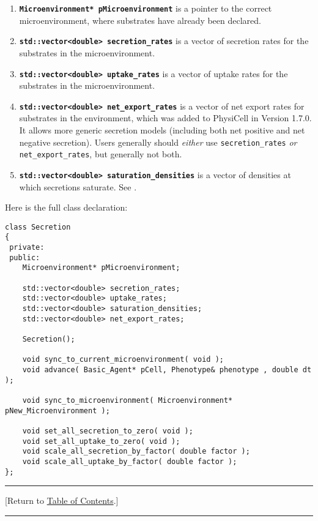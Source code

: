 \documentclass[12pt]{article}
\newcommand{\smallcode}[1]{\textbf{\texttt{#1}}}
\newcommand{\TOClink}{\begin{center}\hrule\vskip-5pt\phantom{.}\hfill[Return to \hyperlink{TOC}{Table of Contents}.]\hfill\phantom{.}\vskip3pt\hrule\end{center}}
\begin{document}
\begin{enumerate}
\item 
\smallcode{Microenvironment* pMicroenvironment} is a pointer to the correct microenvironment, where substrates have already been declared. 

\item 
\smallcode{std::vector<double> secretion\_rates} is a vector of secretion rates for the substrates in the microenvironment. 

\item 
\smallcode{std::vector<double> uptake\_rates} is a vector of uptake rates for the substrates in the microenvironment. 

\item 
\smallcode{std::vector<double> net\_export\_rates} is a vector of net export rates for substrates in the environment, which was 
added to PhysiCell in Version 1.7.0. It allows more generic secretion models (including both net positive and net negative secretion). 
Users generally should \emph{either} use \verb|secretion_rates| \emph{or} \verb|net_export_rates|, but generally not both. 

\item 
\smallcode{std::vector<double> saturation\_densities} is a vector of densities at which secretions saturate. See \cite{ref:BioFVM}. 
\end{enumerate}

Here is the full class declaration:
\begin{verbatim}
class Secretion
{
 private:
 public:
    Microenvironment* pMicroenvironment; 
    
    std::vector<double> secretion_rates; 
    std::vector<double> uptake_rates; 
    std::vector<double> saturation_densities;
    std::vector<double> net_export_rates; 

    Secretion();      

    void sync_to_current_microenvironment( void );      
    void advance( Basic_Agent* pCell, Phenotype& phenotype , double dt ); 
    
    void sync_to_microenvironment( Microenvironment* pNew_Microenvironment );
    
    void set_all_secretion_to_zero( void ); 
    void set_all_uptake_to_zero( void ); 
    void scale_all_secretion_by_factor( double factor ); 
    void scale_all_uptake_by_factor( double factor ); 
};
\end{verbatim}

\TOClink
\end{document}
